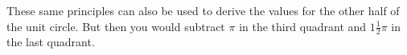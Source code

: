 \documentclass[preview]{standalone}
\begin{document}
\begin{center}
These same principles can also be used to derive the values for the other half of the unit circle. But then you would subtract $\pi$ in the third quadrant and $1 \frac{1}{2} \pi$ in the last quadrant.
\end{center}
\end{document}

